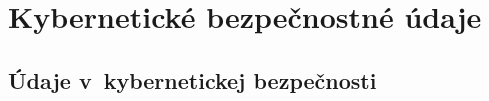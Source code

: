 \documentclass[thesismargins, thesislinespacing, openright, upjsfrontpage]{rnthesis}
\begin{document}



% 




% 
\chapter{Kybernetické bezpečnostné údaje}

\section{Údaje v~kybernetickej bezpečnosti}
\end{document}
